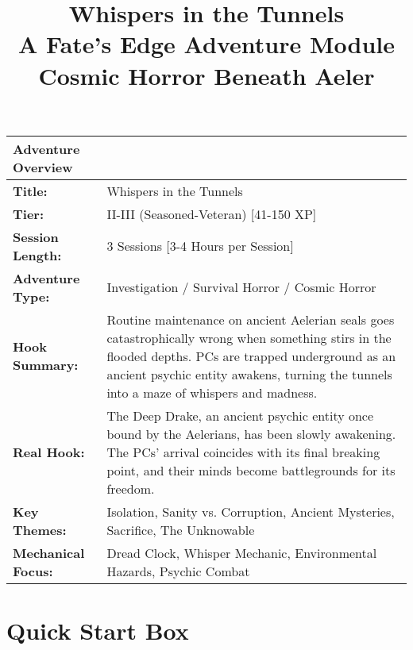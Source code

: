 \documentclass[11pt]{article}
\title{\Huge\textbf{Whispers in the Tunnels}\\
\Large A Fate's Edge Adventure Module\\
\large Cosmic Horror Beneath Aeler}
\author{}
\date{}
\begin{document}
\maketitle

\begin{center}
\begin{tabular}{|p{2.5cm}|p{12cm}|}
\hline
\textbf{Adventure Overview} & \\
\hline
\textbf{Title:} & Whispers in the Tunnels \\
\textbf{Tier:} & II-III (Seasoned-Veteran) [41-150 XP] \\
\textbf{Session Length:} & 3 Sessions [3-4 Hours per Session] \\
\textbf{Adventure Type:} & Investigation / Survival Horror / Cosmic Horror \\
\textbf{Hook Summary:} & Routine maintenance on ancient Aelerian seals goes catastrophically wrong when something stirs in the flooded depths. PCs are trapped underground as an ancient psychic entity awakens, turning the tunnels into a maze of whispers and madness. \\
\textbf{Real Hook:} & The Deep Drake, an ancient psychic entity once bound by the Aelerians, has been slowly awakening. The PCs' arrival coincides with its final breaking point, and their minds become battlegrounds for its freedom. \\
\textbf{Key Themes:} & Isolation, Sanity vs. Corruption, Ancient Mysteries, Sacrifice, The Unknowable \\
\textbf{Mechanical Focus:} & Dread Clock, Whisper Mechanic, Environmental Hazards, Psychic Combat \\
\hline
\end{tabular}
\end{center}

\section{Quick Start Box}
\end{document}
